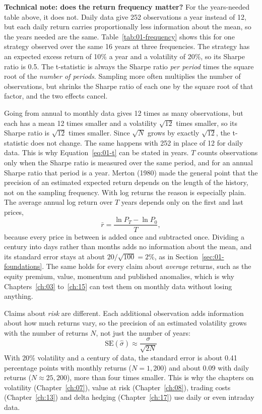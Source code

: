 \begin{technote}
\textbf{Technical note: does the return frequency matter?} For the years-needed table above, it does not. Daily data give 252 observations a year instead of 12, but each daily return carries proportionally less information about the mean, so the years needed are the same. Table~\ref{tab:01-frequency} shows this for one strategy observed over the same 16 years at three frequencies. The strategy has an expected excess return of 10\% a year and a volatility of 20\%, so its Sharpe ratio is 0.5. The t-statistic is always the Sharpe ratio \emph{per period} times the square root of the \emph{number of periods}. Sampling more often multiplies the number of observations, but shrinks the Sharpe ratio of each one by the square root of that factor, and the two effects cancel.


Going from annual to monthly data gives 12 times as many observations, but each has a mean 12 times smaller and a volatility $\sqrt{12}$ times smaller, so its Sharpe ratio is $\sqrt{12}$ times smaller. Since $\sqrt{N}$ grows by exactly $\sqrt{12}$, the t-statistic does not change. The same happens with 252 in place of 12 for daily data. This is why Equation~\eqref{eq:01-t} can be stated in years. $T$ counts observations only when the Sharpe ratio is measured over the same period, and for an annual Sharpe ratio that period is a year. Merton (1980) made the general point that the precision of an estimated expected return depends on the length of the history, not on the sampling frequency. With log returns the reason is especially plain. The average annual log return over $T$ years depends only on the first and last prices,
\begin{equation}
  \bar{r} = \frac{\ln P_T - \ln P_0}{T}, \nonumber
\end{equation}
because every price in between is added once and subtracted once. Dividing a century into days rather than months adds no information about the mean, and its standard error stays at about $20/\sqrt{100} = 2$\%, as in Section~\ref{sec:01-foundations}. The same holds for every claim about \emph{average} returns, such as the equity premium, value, momentum and published anomalies, which is why Chapters~\ref{ch:03} to~\ref{ch:15} can test them on monthly data without losing anything.

Claims about \emph{risk} are different. Each additional observation adds information about how much returns vary, so the precision of an estimated volatility grows with the number of returns $N$, not just the number of years:
\begin{equation}
  \mathrm{SE}(\hat{\sigma}) \approx \frac{\sigma}{\sqrt{2N}} \nonumber
\end{equation}
With 20\% volatility and a century of data, the standard error is about 0.41 percentage points with monthly returns ($N = 1{,}200$) and about 0.09 with daily returns ($N \approx 25{,}200$), more than four times smaller. This is why the chapters on volatility (Chapter~\ref{ch:07}), value at risk (Chapter~\ref{ch:08}), trading costs (Chapter~\ref{ch:13}) and delta hedging (Chapter~\ref{ch:17}) use daily or even intraday data.


\end{technote}
